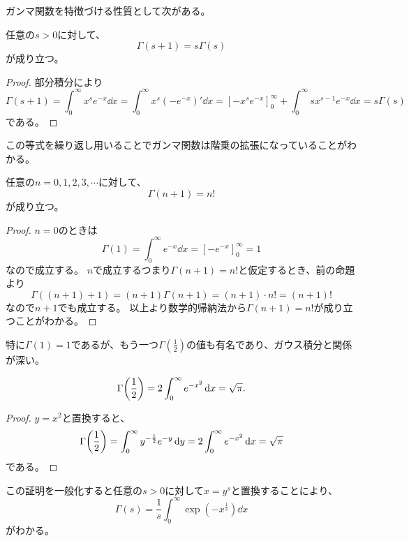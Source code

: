 ガンマ関数を特徴づける性質として次がある。

\begin{proposition}
任意の$s > 0$に対して、
$$
\Gamma(s+1) = s\Gamma(s)
$$
が成り立つ。
\end{proposition}

\begin{proof}
部分積分により
$$
\Gamma(s+1) = \int_0^\infty x^s e^{-x}\dd{x} = \int_0^\infty x^s (-e^{-x})'\dd{x}
= [-x^s e^{-x}]_0^\infty+\int_0^\infty s x^{s-1} e^{-x}\dd{x}
= s\Gamma(s)
$$
である。
\end{proof}

この等式を繰り返し用いることでガンマ関数は階乗の拡張になっていることがわかる。

\begin{proposition}
任意の$n = 0, 1, 2, 3, \cdots$に対して、
$$
\Gamma(n+1) = n!
$$
が成り立つ。
\end{proposition}

\begin{proof}
$n = 0$のときは
$$
\Gamma(1) = \int_0^\infty e^{-x}\dd{x} = [-e^{-x}]_0^\infty = 1
$$
なので成立する。
$n$で成立するつまり$\Gamma(n+1) = n!$と仮定するとき、前の命題より
$$
\Gamma((n+1)+1) = (n+1)\Gamma(n+1) = (n+1)\cdot n! = (n+1)!
$$
なので$n+1$でも成立する。
以上より数学的帰納法から$\Gamma(n+1) = n!$が成り立つことがわかる。
\end{proof}

特に$\Gamma(1) = 1$であるが、もう一つ$\Gamma(\frac{1}{2})$の値も有名であり、ガウス積分と関係が深い。

\begin{proposition}
$$
\Gamma\qty(\frac{1}{2}) = 2\int_0^\infty e^{-x^2}\dd{x} = \sqrt{\pi}.
$$
\end{proposition}

\begin{proof}
$y = x^2$と置換すると、
$$
\Gamma\qty(\frac{1}{2}) = \int_0^\infty y^{-\frac{1}{2}}e^{-y}\dd{y} = 2\int_0^\infty e^{-x^2}\dd{x} = \sqrt{\pi}
$$
である。
\end{proof}

\begin{remark}
この証明を一般化すると任意の$s > 0$に対して$x = y^s$と置換することにより、
$$
\Gamma(s) = \frac{1}{s}\int_0^\infty \exp(-x^{\frac{1}{s}})\dd{x}
$$
がわかる。
\end{remark}
